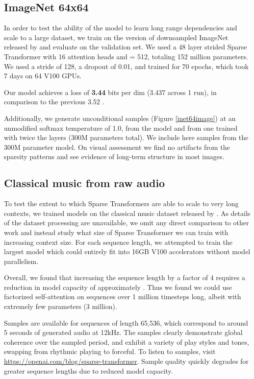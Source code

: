 \documentclass{article}
\begin{document}
\subsection{ImageNet 64x64}

In order to test the ability of the model to learn long range dependencies and scale to a large dataset, we train on the version of downsampled ImageNet released by \cite{oord2016pixel} and evaluate on the validation set. We used a 48 layer strided Sparse Transformer with 16 attention heads and  = 512, totaling 152 million parameters. We used a stride of 128, a dropout of 0.01, and trained for 70 epochs, which took 7 days on 64 V100 GPUs.

Our model achieves a loss of \textbf{3.44} bits per dim (3.437 across 1 run), in comparison to the previous 3.52 \cite{menick2018generating}. 

Additionally, we generate unconditional samples (Figure \ref{inet64image}) at an unmodified softmax temperature of 1.0, from the model and from one trained with twice the layers (300M parameters total). We include here samples from the 300M parameter model. On visual assessment we find no artifacts from the sparsity patterns and see evidence of long-term structure in most images. 

\subsection{Classical music from raw audio}

To test the extent to which Sparse Transformers are able to scale to very long contexts, we trained models on the classical music dataset released by \cite{dieleman2018challenge}. As details of the dataset processing are unavailable, we omit any direct comparison to other work and instead study what size of Sparse Transformer we can train with increasing context size. For each sequence length, we attempted to train the largest model which could entirely fit into 16GB V100 accelerators without model parallelism.

Overall, we found that increasing the sequence length by a factor of 4 requires a reduction in model capacity of approximately . Thus we found we could use factorized self-attention on sequences over 1 million timesteps long, albeit with extremely few parameters (3 million).

Samples are available for sequences of length 65,536, which correspond to around 5 seconds of generated audio at 12kHz. The samples clearly demonstrate global coherence over the sampled period, and exhibit a variety of play styles and tones, swapping from rhythmic playing to forceful. To listen to samples, visit \url{https://openai.com/blog/sparse-transformer}. Sample quality quickly degrades for greater sequence lengths due to reduced model capacity. 
\end{document}

